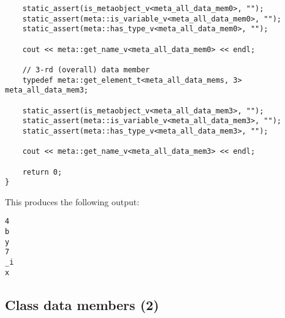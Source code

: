 \begin{verbatim}
	static_assert(is_metaobject_v<meta_all_data_mem0>, "");
	static_assert(meta::is_variable_v<meta_all_data_mem0>, "");
	static_assert(meta::has_type_v<meta_all_data_mem0>, "");

	cout << meta::get_name_v<meta_all_data_mem0> << endl;

	// 3-rd (overall) data member
	typedef meta::get_element_t<meta_all_data_mems, 3> meta_all_data_mem3;

	static_assert(is_metaobject_v<meta_all_data_mem3>, "");
	static_assert(meta::is_variable_v<meta_all_data_mem3>, "");
	static_assert(meta::has_type_v<meta_all_data_mem3>, "");

	cout << meta::get_name_v<meta_all_data_mem3> << endl;

	return 0;
}

\end{verbatim}

This produces the following output:

\begin{verbatim}
4
b
y
7
_i
x
\end{verbatim}

\subsection{Class data members (2)}

